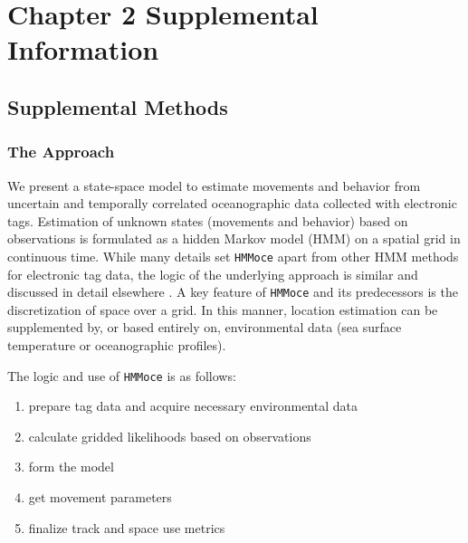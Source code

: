 
\chapter{Chapter 2 Supplemental Information}
\label{sec:app2}
\raggedbottom

{\let\thefootnote\relax{}}
{\let\thefootnote\relax{}}

\clearpage

\section{Supplemental Methods}

\subsection{The Approach}

We present a state-space model to estimate movements and behavior from uncertain and temporally correlated oceanographic data collected with electronic tags. Estimation of unknown states (movements and behavior) based on observations is formulated as a hidden Markov model (HMM) on a spatial grid in continuous time. While many details set \texttt{HMMoce} apart from other HMM methods for electronic tag data, the logic of the underlying approach is similar and discussed in detail elsewhere \citep{Pedersen2008, Pedersen2011, Thygesen2009a}. A key feature of \texttt{HMMoce} and its predecessors is the discretization of space over a grid. In this manner, location estimation can be supplemented by, or based entirely on, environmental data (\eg sea surface temperature or oceanographic profiles).

The logic and use of \texttt{HMMoce} is as follows: 
\begin{enumerate}[itemsep=-1mm]
    \item prepare tag data and acquire necessary environmental data
    \item calculate gridded likelihoods based on observations
    \item form the model
    \item get movement parameters
    \item finalize track and space use metrics
\end{enumerate}

